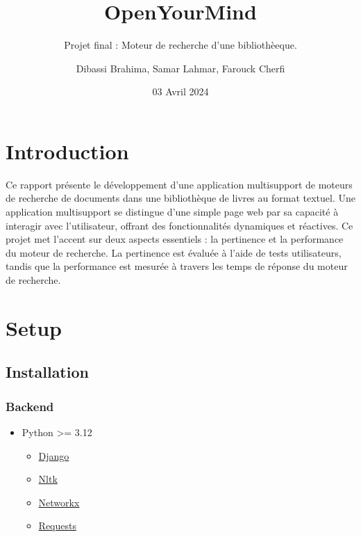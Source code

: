 \documentclass[
  12pt,
]{article}
\title{OpenYourMind}
\subtitle{Projet ﬁnal : Moteur de recherche d'une bibliothèeque.}
\author{Dibassi Brahima, Samar Lahmar, Farouck Cherfi}
\date{03 Avril 2024}
\providecommand{\tightlist}{%
  \setlength{\itemsep}{0pt}\setlength{\parskip}{0pt}}
\begin{document}
\maketitle

\newpage

{
\hypersetup{linkcolor=}
\setcounter{tocdepth}{3}
\tableofcontents
}
\newpage

\section{Introduction}\label{introduction}

Ce rapport présente le développement d'une application multisupport de
moteurs de recherche de documents dans une bibliothèque de livres au
format textuel. Une application multisupport se distingue d'une simple
page web par sa capacité à interagir avec l'utilisateur, offrant des
fonctionnalités dynamiques et réactives. Ce projet met l'accent sur deux
aspects essentiels : la pertinence et la performance du moteur de
recherche. La pertinence est évaluée à l'aide de tests utilisateurs,
tandis que la performance est mesurée à travers les temps de réponse du
moteur de recherche.

\section{Setup}\label{setup}

\subsection{Installation}\label{installation}

\subsubsection{Backend}\label{backend}

\begin{itemize}
\tightlist
\item
  Python \textgreater= 3.12

  \begin{itemize}
  \tightlist
  \item
    \href{https://www.djangoproject.com/}{Django}
  \item
    \href{https://www.nltk.org/}{Nltk}
  \item
    \href{https://networkx.org/}{Networkx}
  \item
    \href{https://docs.python-requests.org/en/master/}{Requests}
  \end{itemize}
\end{itemize}
\end{document}
